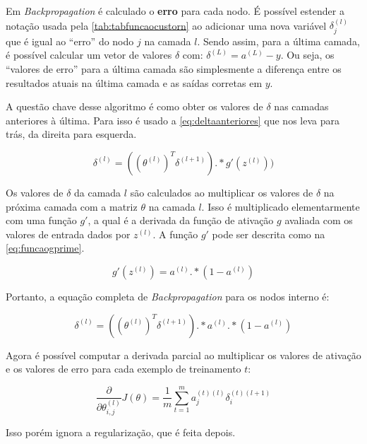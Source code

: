 Em \textit{Backpropagation} é calculado o \textbf{erro} para cada nodo. É possível estender a notação usada pela \autoref{tab:tabfuncaocustorn} ao adicionar uma nova variável $\delta_j^{(l)}$ que é igual ao ``erro'' do nodo $j$ na camada $l$. Sendo assim, para a última camada, é possível calcular um vetor de valores $\delta$ com: $\delta^{(L)} = a^{(L)} - y$. Ou seja, os ``valores de erro'' para a última camada são simplesmente a diferença entre os resultados atuais na última camada e as saídas corretas em $y$.

A questão chave desse algoritmo é como obter os valores de $\delta$ nas camadas anteriores à última. Para isso é usado a \autoref{eq:deltaanteriores} que nos leva para trás, da direita para esquerda.

\begin{equation}\label{eq:deltaanteriores}
\delta^{(l)} = ((\theta^{(l)})^T \delta^{(l+1)}) .* g'(z^{(l)}))
\end{equation}

Os valores de $\delta$ da camada $l$ são calculados ao multiplicar os valores de $\delta$ na próxima camada com a matriz $\theta$ na camada $l$. Isso é multiplicado elementarmente com uma função $g'$, a qual é a derivada da função de ativação $g$ avaliada com os valores de entrada dados por $z^{(l)}$. A função $g'$ pode ser descrita como na \autoref{eq:funcaogprime}.

\begin{equation}\label{eq:funcaogprime}
g'(z^{(l)}) = a^{(l)} .* (1 - a^{(l)}) 
\end{equation}

Portanto, a equação completa de \textit{Backpropagation} para os nodos interno é:

\begin{equation}
\delta^{(l)} = ((\theta^{(l)})^T \delta^{(l+1)}) .* a^{(l)} .* (1 - a^{(l)}) \nonumber
\end{equation}

Agora é possível computar a derivada parcial ao multiplicar os valores de ativação e os valores de erro para cada exemplo de treinamento $t$:

\begin{equation}
\frac{\partial}{\partial\theta_{i,j}^{(l)}} J(\theta) = \frac{1}{m} \sum\limits_{t=1}^{m} a_j^{(t)(l)} \delta_i^{(t)(l+1)} \nonumber
\end{equation}

Isso porém ignora a regularização, que é feita depois.

